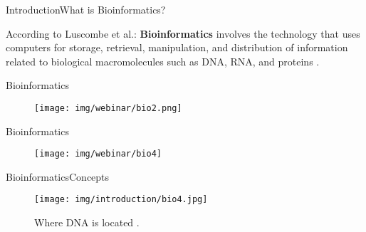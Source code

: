 \documentclass[10pt]{beamer}
\newcommand{\1}{
        	\setbeamertemplate{background}{
        		\texttt{[image: img/1]}
        		\tikz[overlay] \fill[fill opacity=0.75,fill=white] (0,0) rectangle (-\paperwidth,\paperheight);
        	}
}
\begin{document}
\begin{frame}{Introduction}{What is Bioinformatics?}
	
	According to Luscombe et al.: \textbf{Bioinformatics} involves the technology that uses computers for storage, retrieval, manipulation, and distribution of information related to biological macromolecules such as DNA, RNA, and proteins \cite{luscombe2001bioinformatics}.
	
\end{frame}


\begin{frame}{Bioinformatics}
	\begin{figure}[]
		\centering
		\texttt{[image: img/webinar/bio2.png]}
		\label{img:mot2}
	\end{figure}
\end{frame}

\begin{frame}{Bioinformatics}
	\begin{figure}[]
		\centering
		\texttt{[image: img/webinar/bio4]}
		\label{img:mot2}
	\end{figure}
\end{frame}


\begin{frame}{Bioinformatics}{Concepts}
	\begin{figure}[]
		\centering
		\texttt{[image: img/introduction/bio4.jpg]}
		\label{img:mot2}
		\caption{Where DNA is located \cite{dna2020located}.}
	\end{figure}
\end{frame}
\end{document}
